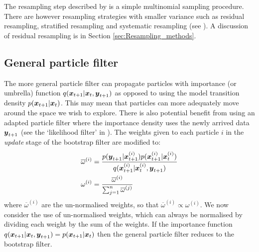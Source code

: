 The resampling step described by \cite{Gordon1993} is a simple multinomial sampling procedure. There are however
resampling strategies with smaller variance such as residual resampling, stratified resampling and systematic resampling
(see \cite{Carpenter1999, Douc2005}). A discussion of residual resampling is in Section \ref{sec:Resampling_methods}.

\subsection{General particle filter}

The more general particle filter can propagate particles with importance (or umbrella) function \(q(\boldsymbol{x}_{t+1} |
\boldsymbol{x}_t, \boldsymbol{y}_{t+1})\) as opposed to using the model transition density \(p(\boldsymbol{x}_{t+1} | \boldsymbol{x}_t)\).
This may mean that particles can more adequately move around the space we wish to explore. There is also potential
benefit from using an adapted particle filter where the importance density uses the newly arrived data \(\boldsymbol{y}_{t+1}\)
(see the `likelihood filter' in \cite{Sanjeev2002}). The weights given to each particle \(i\) in the \textit{update}
stage of the bootstrap filter are modified to:
\begin{align}
\overline{\omega}^{(i)} &= 
\frac{p(\boldsymbol{y}_{t+1} | \boldsymbol{x}_{t+1}^{(i)}) p(\boldsymbol{x}_{t+1}^{(i)} | \boldsymbol{x}_t^{(i)})}
{q(\boldsymbol{x}_{t+1}^{(i)} | \boldsymbol{x}_t^{(i)}, \boldsymbol{y}_{t+1})} \label{eq:generalFilter} \\
\omega^{(i)} &= \frac{\overline{\omega}^{(i)}}{\sum_{j = 1}^n \overline{\omega}^{(j)}}
\end{align}
where \(\overline{\omega}^{(i)}\) are the un-normalised weights, so that \(\overline{\omega}^{(i)} \propto
\omega^{(i)}\). We now consider the use of un-normalised weights, which can always be normalised by dividing each weight
by the sum of the weights. If the importance function \(q(\boldsymbol{x}_{t+1} | \boldsymbol{x}_t, \boldsymbol{y}_{t+1}) = p(\boldsymbol{x}_{t+1} |
\boldsymbol{x}_t)\) then the general particle filter reduces to the bootstrap filter.


